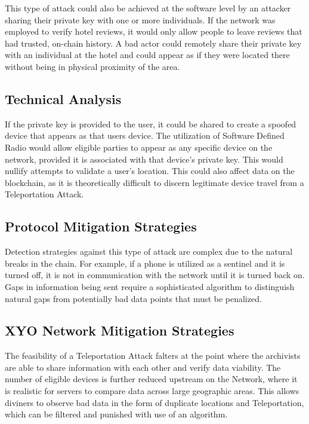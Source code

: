 \documentclass{article}
\begin{document}
This type of attack could also be achieved at the software level by an attacker sharing their private key with one or more individuals. If the network was employed to verify hotel reviews, it would only allow people to leave reviews that had trusted, on-chain history. A bad actor could remotely share their private key with an individual at the hotel and could appear as if they were located there without being in physical proximity of the area.

\subsection{Technical Analysis}
If the private key is provided to the user, it could be shared to create a spoofed device that appears as that users device. The utilization of Software Defined Radio would allow eligible parties to appear as any specific device on the network, provided it is associated with that device's private key. This would nullify attempts to validate a user's location. This could also affect data on the blockchain, as it is theoretically difficult to discern legitimate device travel from a Teleportation Attack. 

\subsection{Protocol Mitigation Strategies}
Detection strategies against this type of attack are complex due to the natural breaks in the chain. For example, if a phone is utilized as a \Gls{sentinel} and it is turned off, it is not in communication with the network until it is turned back on. Gaps in information being sent require a sophisticated algorithm to distinguish natural gaps from potentially bad data points that must be penalized. 

\subsection{XYO Network Mitigation Strategies}
The feasibility of a Teleportation Attack falters at the point where the \Glspl{archivist} are able to share information with each other and verify data viability. The number of eligible devices is further reduced upstream on the Network, where it is realistic for servers to compare data across large geographic areas. This allows \Glspl{diviner} to observe bad data in the form of duplicate locations and Teleportation, which can be filtered and punished with use of an algorithm. 
\end{document}
